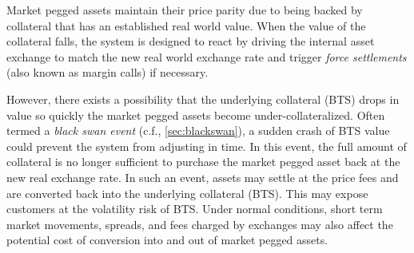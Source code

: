 Market pegged assets maintain their price parity due to being backed by
collateral that has an established real world value. When the value of the
collateral falls, the system is designed to react by driving the internal asset
exchange to match the new real world exchange rate and trigger \emph{force
settlements} (also known as margin calls) if necessary.

However, there exists a possibility that the underlying collateral (BTS) drops
in value so quickly the market pegged assets become under-collateralized. Often
termed a \emph{black swan event} (c.f., \cref{sec:blackswan}), a sudden crash
of BTS value could prevent the system from adjusting in time. In this event,
the full amount of collateral is no longer sufficient to purchase the market
pegged asset back at the new real exchange rate. In such an event, assets may
settle at the price fees and are converted back into the underlying collateral
(BTS). This may expose customers at the volatility risk of BTS. Under normal
conditions, short term market movements, spreads, and fees charged by exchanges
may also affect the potential cost of conversion into and out of market pegged
assets.
